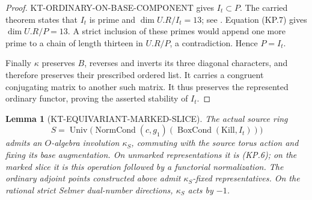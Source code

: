 \documentclass[11pt,a4paper]{article}
\newtheorem{lemma}[theorem]{Lemma}
\theoremstyle{definition}
\begin{document}
\begin{proof}
KT-ORDINARY-ON-BASE-COMPONENT gives $I_t\subset P$.  The carried
theorem  states that $I_t$ is prime and
$\dim U.R/I_t=13$; see
.
Equation (KP.7) gives $\dim U.R/P=13$.  A strict inclusion of
these primes would append one more prime to a chain of length
thirteen in $U.R/P$, a contradiction.  Hence $P=I_t$.

Finally $\kappa$ preserves $B$, reverses and inverts its three
diagonal characters, and therefore preserves their prescribed
ordered list.  It carries a congruent conjugating matrix to
another such matrix.  It thus preserves the represented
ordinary functor, proving the asserted stability of $I_t$.
\end{proof}

\begin{lemma}[KT-EQUIVARIANT-MARKED-SLICE]
The actual source ring
\[
 S=\operatorname{Univ}\bigl(\operatorname{NormCond}(c,g_1)
                        (\operatorname{BoxCond}(\mathrm{Kill},I_t))\bigr)
\]
admits an $O$-algebra involution $\kappa_S$, commuting with the
source torus action and fixing its base augmentation.  On
unmarked representations it is (KP.6); on the marked slice it
is this operation followed by a functorial normalization.
The ordinary adjoint points constructed above admit
$\kappa_S$-fixed representatives.  On the rational strict
Selmer dual-number directions, $\kappa_S$ acts by $-1$.
\end{lemma}
\end{document}
